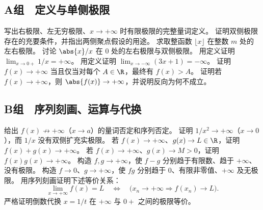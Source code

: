 \subsection*{A组　定义与单侧极限}
\begin{enumerate}[label=\textbf{16.\arabic*.}]
  \mustdo 写出右极限、左无穷极限、\(x\to+\infty\) 时有限极限的完整量词定义。
  \mustdo 证明双侧极限存在的充要条件，并指出两侧聚点假设的用途。
  \mustdo 求取整函数 \(\lfloor x\rfloor\) 在整数 \(m\) 处的左右极限。
  \mustdo 讨论 \(\abs{x}/x\) 在 \(0\) 处的左右极限与双侧极限。
  \mustdo 用定义证明 \(\lim_{x\to0+}1/x=+\infty\)。
  \mustdo 用定义证明 \(\lim_{x\to-\infty}(3x+1)=-\infty\)。
  \mustdo 证明 \(f(x)\to+\infty\) 当且仅当对每个 \(A\in\R\)，最终有 \(f(x)>A\)。
  \mustdo 证明若 \(f(x)\to+\infty\)，则 \(\abs{f(x)}\to+\infty\)，并说明反向为何不成立。
\end{enumerate}

\subsection*{B组　序列刻画、运算与代换}
\begin{enumerate}[label=\textbf{16.\arabic*.},resume]
  \mustdo 给出 \(f(x)\not\to+\infty\)（\(x\to a\)）的量词否定和序列否定。
  \mustdo 证明 \(1/x^2\to+\infty\)（\(x\to0\)），而 \(1/x\) 没有双侧扩充实极限。
  \mustdo 若 \(f(x)\to+\infty\)、\(g(x)\to L\in\R\)，证明 \(f(x)+g(x)\to+\infty\)。
  \mustdo 若 \(f(x)\to+\infty\)、\(g(x)\to M>0\)，证明 \(f(x)g(x)\to+\infty\)。
  \mustdo 构造 \(f,g\to+\infty\)，使 \(f-g\) 分别趋于有限数、趋于 \(+\infty\)、没有极限。
  \mustdo 构造 \(f\to0\)、\(g\to+\infty\)，使 \(fg\) 分别趋于 \(0\)、有限非零值、\(+\infty\) 及无极限。
  \mustdo 用序列刻画证明下述等价关系：
 \[
  \lim_{x\to+\infty}f(x)=L
  \quad\Longleftrightarrow\quad
  \bigl(x_n\to+\infty\Rightarrow f(x_n)\to L\bigr).
 \]
  \mustdo 严格证明倒数代换 \(x=1/t\) 在 \(+\infty\) 与 \(0+\) 之间的极限等价。
\end{enumerate}


